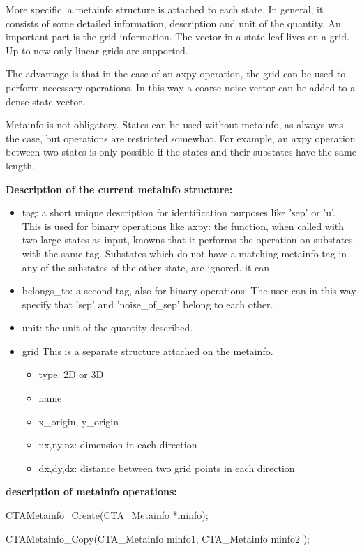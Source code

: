 \documentclass[a4paper,12pt]{article}
\begin{document}
More specific, a metainfo structure is attached to each state. In general, it
consists of some detailed information, description and unit of the quantity. An
important part is the grid information. The vector in a state leaf lives on a
grid. Up to now only linear grids are supported.

The advantage is that in the case of an axpy-operation, the grid can be used to
perform necessary operations. In this way a coarse noise vector can be added to
a dense state vector.


Metainfo is not obligatory. States can be used without metainfo, as always was
the case, but operations are restricted somewhat. For example, an axpy
operation between two states is only possible if the states and their substates
have the same length.


{\bf Description of the current metainfo structure:}
\begin{itemize}
\item tag: a short unique description for identification purposes like 'sep' or
  'u'. This is used for binary operations like axpy: the function, when called
  with two large states as input, knowns that it performs the operation on
  substates with the same tag. Substates which do not have a matching
  metainfo-tag in any of the substates of the other state, are ignored.
  it can 
\item belongs\_to: a second tag, also for binary operations. The user can in
  this way specify that 'sep' and 'noise\_of\_sep' belong to each other.
\item unit: the unit of the quantity described.
\item grid This is a separate structure attached on the metainfo.
   \begin{itemize}
     \item type: 2D or 3D
     \item name
     \item x\_origin, y\_origin
     \item nx,ny,nz: dimension in each direction
     \item dx,dy,dz: distance between two grid points in each direction
   \end{itemize}


\end{itemize}

{\bf description of metainfo operations:}

CTA\-Metainfo\_Create(CTA\_Metainfo *minfo);

CTA\-Metainfo\_Copy(CTA\_Metainfo minfo1, CTA\_Metainfo minfo2 );
\end{document}

